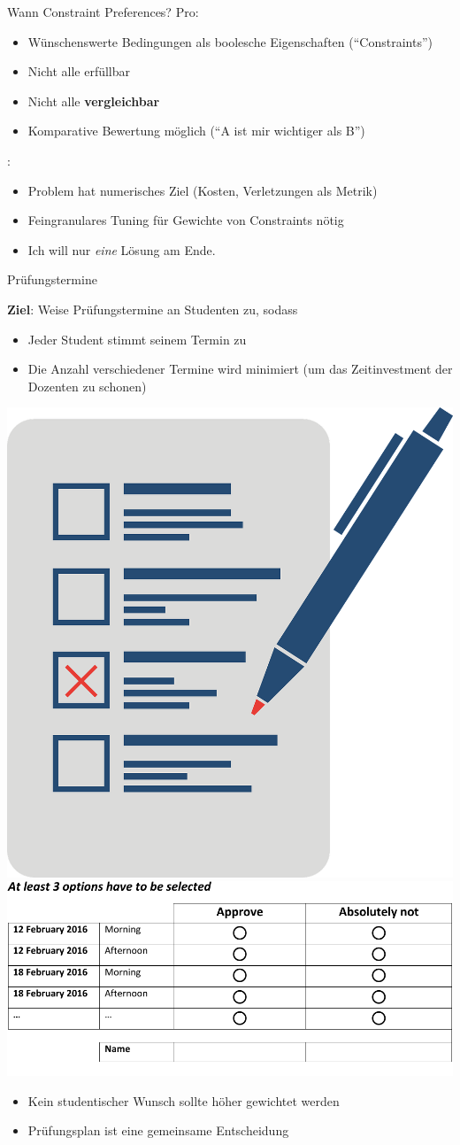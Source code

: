 \begin{frame}{Wann Constraint Preferences?}
\alert{Pro}:

\begin{itemize}
\item Wünschenswerte Bedingungen als boolesche Eigenschaften (``Constraints'')
\item Nicht alle erfüllbar
\item Nicht alle \textbf{vergleichbar}
\item \alert{Komparative} Bewertung möglich (``A ist mir wichtiger als B'')
\end{itemize}

\vspace*{2ex}
:

\begin{itemize}
\item Problem hat numerisches Ziel (Kosten, Verletzungen als Metrik)
\item Feingranulares Tuning für Gewichte von Constraints nötig
\item Ich will nur \emph{eine} Lösung am Ende.
\end{itemize}
\end{frame}

\begin{frame}[fragile]{Prüfungstermine}

\textbf{Ziel}: Weise Prüfungstermine an Studenten zu, sodass
\begin{itemize}
\item Jeder Student stimmt seinem Termin zu 
\item Die Anzahl verschiedener Termine wird minimiert (um das Zeitinvestment der Dozenten zu schonen)
\end{itemize}

\begin{center}
\includegraphics[width=.15\textwidth]{img/voting.png}
\hspace*{4ex}
\includegraphics[width=.5\textwidth]{img/Voting.pdf}
\end{center}

\begin{itemize}
\item Kein studentischer Wunsch sollte höher gewichtet werden
\item Prüfungsplan ist eine gemeinsame Entscheidung

\end{itemize}
\end{frame}

